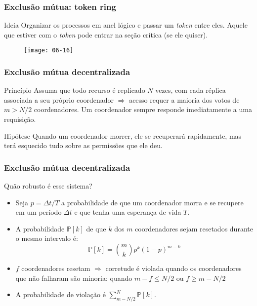 \documentclass[Ligatures=TeX,table,brazil,svgnames,usetotalslideindicator,compress,10pt]{beamer}
\begin{document}
\begin{frame}
  \frametitle{Exclusão mútua: token ring}
  \begin{block}{Ideia}
    Organizar os processos em anel \alert{lógico} e passar um \textit{token} entre eles. Aquele que estiver com o \textit{token} pode entrar na seção crítica (se ele quiser).
  \end{block}

  \begin{figure}
    \centering
    \texttt{[image: 06-16]}
  \end{figure}

\end{frame}

\begin{frame}
  \frametitle{Exclusão mútua decentralizada}
  \begin{block}{Princípio}
    Assuma que todo recurso é replicado $N$ vezes, com cada réplica associada a seu próprio coordenador  $\Rightarrow$ acesso requer a \alert{maioria dos votos} de $m > N/2$ coordenadores. Um coordenador sempre responde imediatamente a uma requisição.
  \end{block}

  \begin{block}{Hipótese}
    Quando um coordenador morrer, ele se recuperará rapidamente, mas terá esquecido tudo sobre as permissões que ele deu.
  \end{block}

\end{frame}

\begin{frame}
  \frametitle{Exclusão mútua decentralizada}

  \begin{block}{Quão robusto é esse sistema?}
    \begin{itemize}
      \item Seja $p = \Delta t / T$ a probabilidade de que um coordenador morra e se recupere em um período $\Delta t$ e que tenha uma esperança de vida $T$.
        \item A probabilidade $\mathbb{P}[k]$ de que $k$ dos $m$ coordenadores sejam resetados durante o mesmo intervalo é:
    \[ \mathbb{P}[k] = \binom{m}{k} p^k (1 - p)^{m-k}\]
  \item $f$ coordenadores resetam $\Rightarrow$ \alert{corretude é violada quando os coordenadores que não falharam são minoria}: quando $m-f \le N/2$ ou $f \ge m-N/2$
  \item A probabilidade de violação é $\sum^N_{m-N/2} \mathbb{P}[k]$.
  \end{itemize}
\end{block}
\end{frame}
\end{document}
